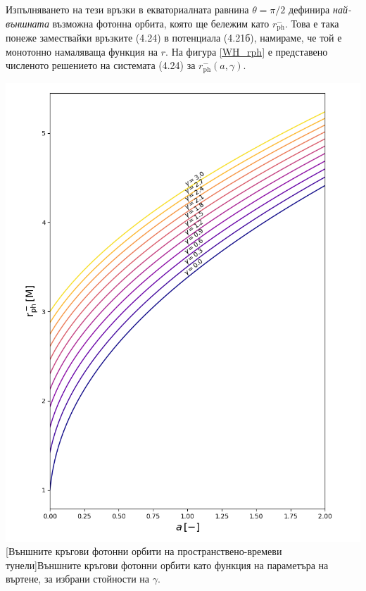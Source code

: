 	Изпълняването на тези връзки в екваториалната равнина $\theta = \pi / 2$ дефинира \emph{най-външната} възможна фотонна орбита, която ще бележим като $r_{\text{ph}}^-$. Това е така понеже замествайки връзките (4.24) в потенциала (4.21б), намираме, че той е монотонно намаляваща функция на $r$. На фигура \ref{WH_rph} е представено численото решението на системата (4.24) за $r^-_{\text{ph}}(a,\gamma)$. \\
	
	\noindent\begin{minipage}{14em}
		\hspace{-0.5cm}
		\includegraphics[scale = 0.35]{WH_rph.png}
		[Външните кръгови фотонни орбити на пространствено-времеви тунели]{\small Външните кръгови фотонни орбити като функция на параметъра на въртене, за избрани стойности на $\gamma$.}
		\label{WH_rph}
	\end{minipage}\,\,\,

